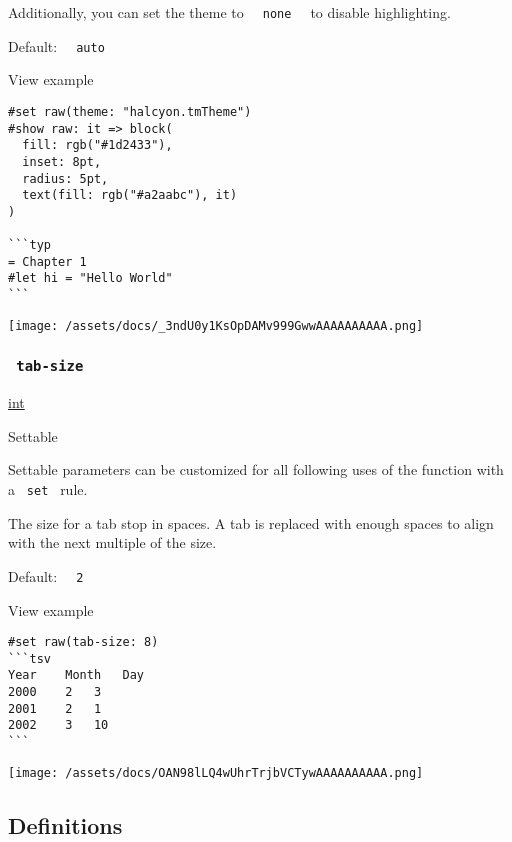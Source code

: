 Additionally, you can set the theme to
\texttt{\ }{\texttt{\ none\ }}\texttt{\ } to disable highlighting.

Default: \texttt{\ }{\texttt{\ auto\ }}\texttt{\ }


View example

\begin{verbatim}
#set raw(theme: "halcyon.tmTheme")
#show raw: it => block(
  fill: rgb("#1d2433"),
  inset: 8pt,
  radius: 5pt,
  text(fill: rgb("#a2aabc"), it)
)

```typ
= Chapter 1
#let hi = "Hello World"
```
\end{verbatim}

\texttt{[image: /assets/docs/\_3ndU0y1KsOpDAMv999GwwAAAAAAAAAA.png]}

\subsubsection{\texorpdfstring{\texttt{\ tab-size\ }}{ tab-size }}\label{parameters-tab-size}

\href{/docs/reference/foundations/int/}{int}

{{ Settable }}

\label{parameters-tab-size-settable-tooltip}
Settable parameters can be customized for all following uses of the
function with a \texttt{\ set\ } rule.

The size for a tab stop in spaces. A tab is replaced with enough spaces
to align with the next multiple of the size.

Default: \texttt{\ }{\texttt{\ 2\ }}\texttt{\ }


View example

\begin{verbatim}
#set raw(tab-size: 8)
```tsv
Year    Month   Day
2000    2   3
2001    2   1
2002    3   10
```
\end{verbatim}

\texttt{[image: /assets/docs/OAN98lLQ4wUhrTrjbVCTywAAAAAAAAAA.png]}

\subsection{\texorpdfstring{{ Definitions
}}{ Definitions }}\label{definitions}

